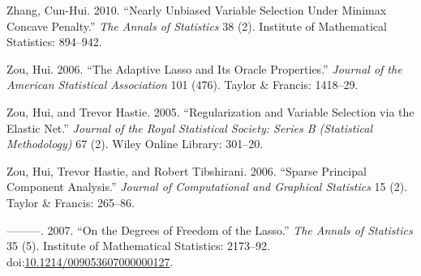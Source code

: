\documentclass[article]{jss}
\begin{document}
\hypertarget{ref-zhang2010nearly}{}
Zhang, Cun-Hui. 2010. ``Nearly Unbiased Variable Selection Under Minimax
Concave Penalty.'' \emph{The Annals of Statistics} 38 (2). Institute of
Mathematical Statistics: 894--942.

\hypertarget{ref-zou2006adaptive}{}
Zou, Hui. 2006. ``The Adaptive Lasso and Its Oracle Properties.''
\emph{Journal of the American Statistical Association} 101 (476). Taylor
\& Francis: 1418--29.

\hypertarget{ref-zou2005regularization}{}
Zou, Hui, and Trevor Hastie. 2005. ``Regularization and Variable
Selection via the Elastic Net.'' \emph{Journal of the Royal Statistical
Society: Series B (Statistical Methodology)} 67 (2). Wiley Online
Library: 301--20.

\hypertarget{ref-zou2006sparse}{}
Zou, Hui, Trevor Hastie, and Robert Tibshirani. 2006. ``Sparse Principal
Component Analysis.'' \emph{Journal of Computational and Graphical
Statistics} 15 (2). Taylor \& Francis: 265--86.

\hypertarget{ref-Zou2007}{}
---------. 2007. ``On the Degrees of Freedom of the Lasso.'' \emph{The
Annals of Statistics} 35 (5). Institute of Mathematical Statistics:
2173--92.
doi:\href{https://doi.org/10.1214/009053607000000127}{10.1214/009053607000000127}.
\end{document}
